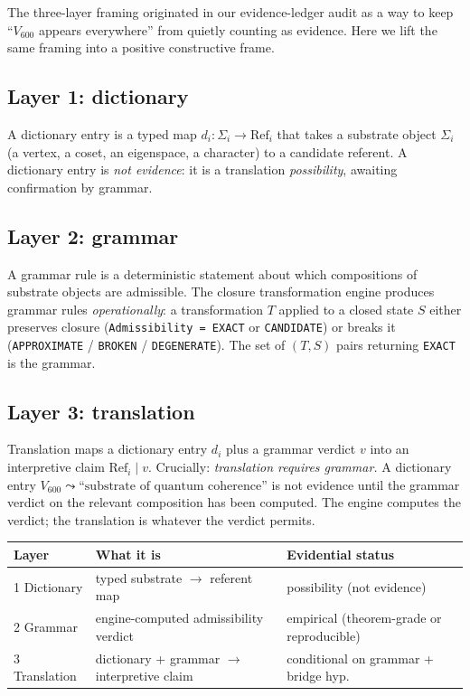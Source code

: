 \documentclass[11pt,a4paper]{article}
\newcommand{\Vsix}{V_{600}}
\begin{document}
The three-layer framing originated in our evidence-ledger audit
\cite{evidenceLedger} as a way to keep ``$\Vsix$ appears
everywhere'' from quietly counting as evidence. Here we lift the
same framing into a positive constructive frame.

\subsection{Layer 1: dictionary}

A dictionary entry is a typed map
$d_i : \Sigma_i \to \mathrm{Ref}_i$ that takes a substrate object
$\Sigma_i$ (a vertex, a coset, an eigenspace, a character) to a
candidate referent. A dictionary entry is \emph{not evidence}: it
is a translation \emph{possibility}, awaiting confirmation by
grammar.

\subsection{Layer 2: grammar}

A grammar rule is a deterministic statement about which
compositions of substrate objects are admissible. The closure
transformation engine produces grammar rules
\emph{operationally}: a transformation $T$ applied to a closed
state $S$ either preserves closure (\texttt{Admissibility = EXACT}
or \texttt{CANDIDATE}) or breaks it
(\texttt{APPROXIMATE} / \texttt{BROKEN} / \texttt{DEGENERATE}).
The set of $(T, S)$ pairs returning \texttt{EXACT} is the grammar.

\subsection{Layer 3: translation}

Translation maps a dictionary entry $d_i$ plus a grammar verdict
$v$ into an interpretive claim
$\mathrm{Ref}_i \mid v$. Crucially: \emph{translation requires
grammar.} A dictionary entry $\Vsix \leadsto \text{``substrate of
quantum coherence''}$ is not evidence until the grammar verdict on
the relevant composition has been computed. The engine computes
the verdict; the translation is whatever the verdict permits.

\begin{tcolorbox}[colback=gray!5,colframe=gray!50!black,
  title={The three layers, restated}]
\begin{tabular}{lll}
\toprule
\textbf{Layer} & \textbf{What it is} & \textbf{Evidential status} \\
\midrule
1 Dictionary  & typed substrate $\to$ referent map
              & possibility (not evidence) \\
2 Grammar     & engine-computed admissibility verdict
              & empirical (theorem-grade or reproducible) \\
3 Translation & dictionary + grammar $\to$ interpretive claim
              & conditional on grammar + bridge hyp.\ \\
\bottomrule
\end{tabular}
\end{tcolorbox}
\end{document}
